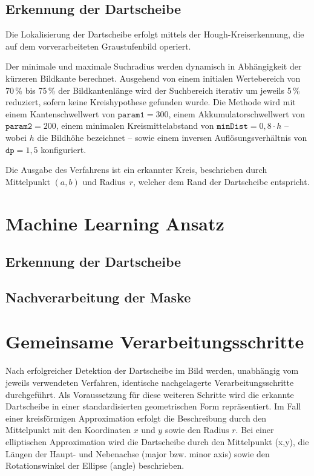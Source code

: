 \subsection{Erkennung der Dartscheibe}

Die Lokalisierung der Dartscheibe erfolgt mittels der Hough-Kreiserkennung, die auf dem vorverarbeiteten Graustufenbild operiert. 

Der minimale und maximale Suchradius werden dynamisch in Abhängigkeit der kürzeren Bildkante berechnet. Ausgehend von einem initialen Wertebereich von 70\,\% bis 75\,\% der Bildkantenlänge wird der Suchbereich iterativ um jeweils 5\,\% reduziert, sofern keine Kreishypothese gefunden wurde. Die Methode wird mit einem Kantenschwellwert von $\mathtt{param1} = 300$, einem Akkumulatorschwellwert von $\mathtt{param2} = 200$, einem minimalen Kreismittelabstand von $\mathtt{minDist} = 0{,}8 \cdot h$ -- wobei $h$ die Bildhöhe bezeichnet -- sowie einem inversen Auflösungsverhältnis von $\mathtt{dp} = 1{,}5$ konfiguriert. 

Die Ausgabe des Verfahrens ist ein erkannter Kreis, beschrieben durch Mittelpunkt $(a, b)$ und Radius~$r$, welcher dem Rand der Dartscheibe entspricht.

\section{Machine Learning Ansatz}

\label{sec:ml-ansatz}

\subsection{Erkennung der Dartscheibe}

\subsection{Nachverarbeitung der Maske}

\section{Gemeinsame Verarbeitungsschritte}

Nach erfolgreicher Detektion der Dartscheibe im Bild werden, unabhängig vom jeweils verwendeten Verfahren, identische nachgelagerte Verarbeitungsschritte durchgeführt. Als Voraussetzung für diese weiteren Schritte wird die erkannte Dartscheibe in einer standardisierten geometrischen Form repräsentiert. Im Fall einer kreisförmigen Approximation erfolgt die Beschreibung durch den Mittelpunkt mit den Koordinaten $x$ und $y$ sowie den Radius $r$. Bei einer elliptischen Approximation wird die Dartscheibe durch den Mittelpunkt (x,y), die Längen der Haupt- und Nebenachse (major bzw. minor axis) sowie den Rotationswinkel der Ellipse (angle) beschrieben.

